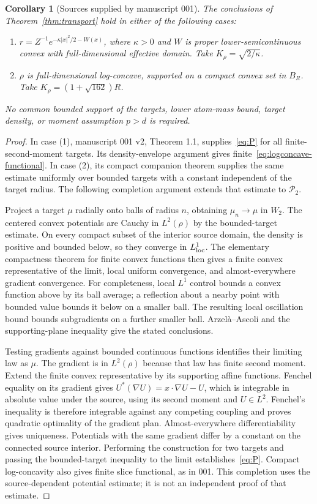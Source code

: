 \documentclass[11pt]{article}
\newtheorem{corollary}[theorem]{Corollary}
\theoremstyle{remark}\newtheorem{remark}[theorem]{Remark}
\newcommand{\Ptwo}{\mathcal P_2}\newcommand{\TV}{\operatorname{TV}}
\begin{document}
\begin{corollary}[Sources supplied by manuscript 001]\label{cor:sources}
The conclusions of Theorem~\ref{thm:transport} hold in either of the following cases:
\begin{enumerate}
\item $r=Z^{-1}e^{-\kappa|x|^2/2-W(x)}$, where $\kappa>0$ and $W$ is proper lower-semicontinuous convex with full-dimensional effective domain. Take $K_\rho=\sqrt{2/\kappa}$.
\item $\rho$ is full-dimensional log-concave, supported on a compact convex set in $B_R$. Take $K_\rho=(1+\sqrt{162})R$.
\end{enumerate}
No common bounded support of the targets, lower atom-mass bound, target density, or moment assumption $p>d$ is required.
\end{corollary}
\begin{proof}
In case (1), manuscript 001 v2, Theorem 1.1, supplies~\eqref{eq:P} for all finite-second-moment targets. Its density-envelope argument gives finite~\eqref{eq:logconcave-functional}. In case (2), its compact companion theorem supplies the same estimate uniformly over bounded targets with a constant independent of the target radius. The following completion argument extends that estimate to $\Ptwo$.

Project a target $\mu$ radially onto balls of radius $n$, obtaining $\mu_n\to\mu$ in $W_2$. The centered convex potentials are Cauchy in $L^2(\rho)$ by the bounded-target estimate. On every compact subset of the interior source domain, the density is positive and bounded below, so they converge in $L^1_{\rm loc}$. The elementary compactness theorem for finite convex functions then gives a finite convex representative of the limit, local uniform convergence, and almost-everywhere gradient convergence. For completeness, local $L^1$ control bounds a convex function above by its ball average; a reflection about a nearby point with bounded value bounds it below on a smaller ball. The resulting local oscillation bound bounds subgradients on a further smaller ball. Arzel\`a--Ascoli and the supporting-plane inequality give the stated conclusions.

Testing gradients against bounded continuous functions identifies their limiting law as $\mu$. The gradient is in $L^2(\rho)$ because that law has finite second moment. Extend the finite convex representative by its supporting affine functions. Fenchel equality on its gradient gives
$U^*(\nabla U)=x\cdot\nabla U-U$, which is integrable in absolute value under the source, using its second moment and $U\in L^2$. Fenchel's inequality is therefore integrable against any competing coupling and proves quadratic optimality of the gradient plan. Almost-everywhere differentiability gives uniqueness. Potentials with the same gradient differ by a constant on the connected source interior. Performing the construction for two targets and passing the bounded-target inequality to the limit establishes~\eqref{eq:P}. Compact log-concavity also gives finite slice functional, as in 001. This completion uses the source-dependent potential estimate; it is not an independent proof of that estimate.
\end{proof}
\end{document}
